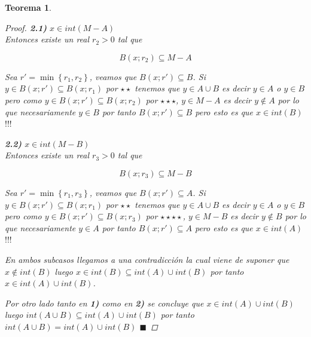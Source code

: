 \documentclass[oneside]{book} %
\theoremstyle{Teorema}
\newtheorem{Teorema}[Definicion]{Teorema}
\theoremstyle{Ejemplos}
\theoremstyle{[Obs]}
\renewcommand{\{}{\left\lbrace} %
\renewcommand{\}}{\right\rbrace} %
\renewcommand{\u}{\cup} %
\renewcommand{\sc}{\subseteq} %
\renewcommand{\qed}{$\blacksquare$} %
\renewcommand{\c}{$!!!\ $} %
\newcommand{\indentar}[2]{{\setlength{\leftskip}{#1} #2 \setlength{\leftskip}{0cm}}} %
\begin{document}
\begin{Teorema}
\begin{proof}
					\indentar{1cm}{

						\textbf{2.1)} $x \in int(M - A)$ \\ 
						Entonces existe un real $r_2 > 0$ tal que 
						
						\begin{equation*}\tag{$\star\star\star$}
							B(x;r_2) \sc M - A
						\end{equation*}
						
						Sea $r' = \min\{ r_1, r_2 \}$, veamos que $B(x;r') \sc B$. Si $y \in B(x;r') \sc B(x;r_1)$ por $\star\star$ tenemos que $y \in A \u B$ es decir $y \in A$ o $y \in B$ pero como $y \in B(x;r') \sc B(x;r_2)$ por $\star\star\star$, $y \in M - A$ es decir $y \notin A$ por lo que necesariamente $y \in B$ por tanto $B(x;r') \sc B$ pero esto es que $x \in int(B)$ \c 

						\textbf{2.2)} $x \in int(M - B)$ \\ 
						Entonces existe un real $r_3 > 0$ tal que 
						
						\begin{equation*}\tag{$\star\star\star\star$}
							B(x;r_3) \sc M - B
						\end{equation*}
						
						Sea $r' = \min\{ r_1, r_3 \}$, veamos que $B(x;r') \sc A$. Si $y \in B(x;r') \sc B(x;r_1)$ por $\star\star$ tenemos que $y \in A \u B$ es decir $y \in A$ o $y \in B$ pero como $y \in B(x;r') \sc B(x;r_3)$ por $\star\star\star\star$, $y \in M - B$ es decir $y \notin B$ por lo que necesariamente $y \in A$ por tanto $B(x;r') \sc A$ pero esto es que $x \in int(A)$ \c  

					}

					En ambos subcasos llegamos a una contradicción la cual viene de suponer que $x \notin int(B)$ luego $x \in int(B) \sc int(A) \u int(B)$ por tanto $x \in int(A) \u int(B)$.

					Por otro lado tanto en \textbf{1)} como en \textbf{2)} se concluye que $x \in  int(A) \u int(B)$ luego $int(A \u B) \sc int(A) \u int(B)$ por tanto $int(A \u B) = int(A) \u int(B)$ \qed
 
				\end{proof}

			\end{Teorema}
\end{document}

